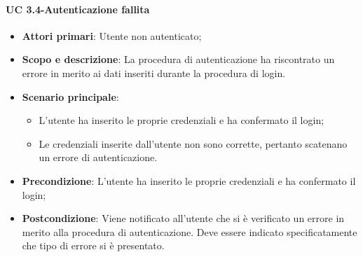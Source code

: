         
        \paragraph{UC 3.4-Autenticazione fallita}
            \begin{itemize}
                \item \textbf{Attori primari}: Utente non autenticato;
                
                \item \textbf{Scopo e descrizione}: La procedura di autenticazione ha riscontrato un errore in merito ai
                dati inseriti durante la procedura di login.  
                   
                \item \textbf{Scenario principale}: 
                    \begin{itemize}
                        \item L'utente ha inserito le proprie credenziali e ha confermato il login;
                        \item Le credenziali inserite dall'utente non sono corrette, pertanto scatenano un errore di autenticazione.
                    \end{itemize}
                \item \textbf{Precondizione}: L'utente ha inserito le proprie credenziali e ha confermato il login;
                 \item \textbf{Postcondizione}: Viene notificato all'utente che si è verificato un errore in merito
                alla procedura di autenticazione. Deve essere indicato specificatamente che tipo di errore si è presentato.
            \end{itemize}
   \newpage
   
